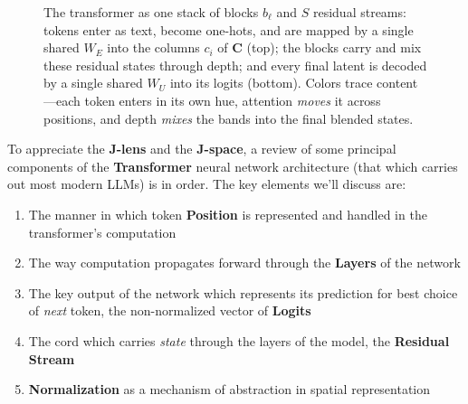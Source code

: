 \documentclass{article}
\newcommand{\logits}{\mathrm{logits}}
\begin{document}
\begin{figure}[htbp]
{}
\caption{The transformer as one stack of blocks $b_\ell$ and $S$ residual streams: tokens enter as text, become one-hots, and are mapped by a single shared $W_E$ into the columns $c_i$ of $\mathbf{C}$ (top); the blocks carry and mix these residual states through depth; and every final latent is decoded by a single shared $W_U$ into its logits (bottom). Colors trace content---each token enters in its own hue, attention \emph{moves} it across positions, and depth \emph{mixes} the bands into the final blended states.}
\label{fig:transformer-grid}
\end{figure}



To appreciate the \textbf{J-lens} and the \textbf{J-space}, a review of some principal components of the \textbf{Transformer} neural network architecture (that which carries out most modern LLMs) is in order. The key elements we'll discuss are:

\begin{enumerate}
    \item The manner in which token \textbf{Position} is represented and handled in the transformer's computation
    \item The way computation propagates forward through the \textbf{Layers} of the network
    \item The key output of the network which represents its prediction for best choice of \textit{next} token, the non-normalized vector of \textbf{Logits}
    \item The cord which carries \textit{state} through the layers of the model, the \textbf{Residual Stream}
    \item \textbf{Normalization} as a mechanism of abstraction in spatial representation
\end{enumerate}
\end{document}
